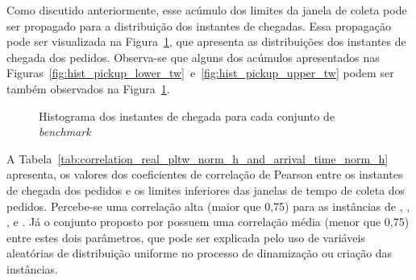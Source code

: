 
Como discutido anteriormente, esse acúmulo dos limites da janela de coleta pode
ser propagado para a distribuição dos instantes de chegadas.
Essa propagação pode ser visualizada na Figura~\ref{fig:hist_arrival_time}, que
apresenta as distribuições dos instantes de chegada dos pedidos.
Observa-se que alguns dos acúmulos apresentados nas 
Figuras~\ref{fig:hist_pickup_lower_tw}~e~\ref{fig:hist_pickup_upper_tw} podem 
ser também observados na Figura~\ref{fig:hist_arrival_time}.


\begin{figure}[h]
    \centering
    \caption{Histograma dos instantes de chegada para cada conjunto 
             de \textit{benchmark}}
    \label{fig:hist_arrival_time}
\end{figure}

A Tabela~\ref{tab:correlation_real_pltw_norm_h_and_arrival_time_norm_h} 
apresenta, os valores dos coeficientes de correlação de Pearson entre os 
instantes de chegada dos pedidos e os limites inferiores das janelas de tempo 
de coleta dos pedidos.
Percebe-se uma correlação alta (maior que 0{,}75) para as instâncias de 
, 
, 
, 
 e
.
Já o conjunto proposto por  
possuem uma correlação média (menor que 0{,}75) entre estes dois parâmetros, 
que pode ser explicada pelo uso de variáveis aleatórias de 
distribuição uniforme no processo de dinamização ou criação das instâncias.


